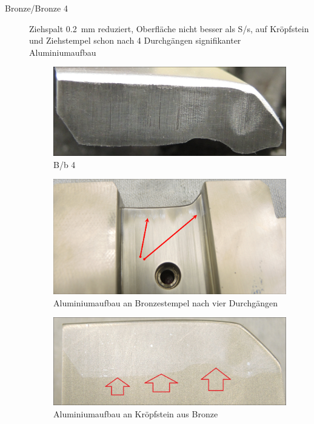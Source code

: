 \documentclass[12pt,a4paper,parskip,twoside,BCOR5mm,headsepline]{scrartcl}
\begin{document}
\begin{description*}
\begin{description}
\item[Bronze/Bronze 4] Ziehspalt \SI{0.2}{\milli\meter} reduziert, Oberfläche nicht besser als S/s, auf Kröpfstein und Ziehstempel schon nach 4 Durchgängen signifikanter Aluminiumaufbau
\begin{figure}[H]
\centering
\includegraphics[width=.8\textwidth]{Bb4}
\caption{B/b 4}
\label{fig:Bb4}
\end{figure}
\begin{figure}[H]
\centering
\includegraphics[width=.8\textwidth]{PunchBAlubau}
\caption{Aluminiumaufbau an Bronzestempel nach vier Durchgängen}
\label{fig:PunchBAlubau}
\end{figure}
\begin{figure}[H]
\centering
\includegraphics[width=.8\textwidth]{DieBAlubau}
\caption{Aluminiumaufbau an Kröpfstein aus Bronze}
\label{fig:DieBAlubauMark}
\end{figure}


\end{description}
\end{description*}
\end{document}
